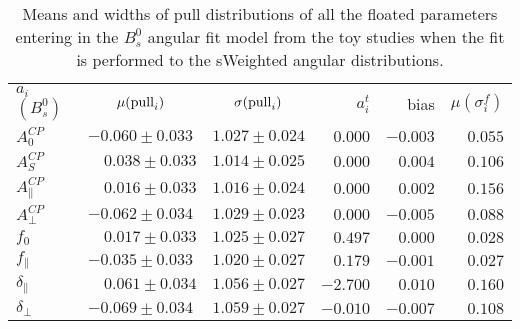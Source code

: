 \begin{table}[htbp]
\begin{center}
\caption[Means and widths of pull distributions of all the floated parameters entering the angular fit model from the toy studies when the fit is performed to the sWeighted angular distributions]{\label{tab:AngularPullResults_sWeights} Means and widths of pull distributions of all the floated parameters entering in the $B^0_s$ angular fit model from the toy studies when the fit is performed to the sWeighted angular distributions. }%
\vspace{5pt}
\begin{tabular}{l|c|c||r|r|r}
 \multirow{2}{*}{$a_i$ $(B^0_s)$} & \multirow{2}{*}{$\mu({\rm pull}_i)$} & \multirow{2}{*}{$\sigma({\rm pull}_i)$} & \multirow{2}{*}{ $a_i^t $ } & \multirow{2}{*}{bias} & \multirow{2}{*}{$\mu(\sigma_i^f) $} \\
					       &	 					  &		&   &   &	\\	
\hline

$A^{C\!P}_0$ 	&$	-0.060	 \pm	0.033	$&$	1.027	 \pm	0.024	$&$	0.000	$&$	-0.003	$&$	0.055	 $\\
$A^{C\!P}_S$ 	&$	\phantom{-}0.038	 \pm	0.033	$&$	1.014	 \pm	0.025	$&$	0.000	$&$	0.004	$&$	0.106	 $\\
$A^{C\!P}_{\|}$ 	&$	\phantom{-}0.016	 \pm	0.033	$&$	1.016	 \pm	0.024	$&$	0.000	$&$	0.002	$&$	0.156	 $\\
$A^{C\!P}_{\perp}$ 	&$	-0.062	 \pm	0.034	$&$	1.029	 \pm	0.023	$&$	0.000	$&$	-0.005	$&$	0.088	 $\\
															
\hline															
															
$f_0$	&$	\phantom{-}0.017	 \pm	0.033	$&$	1.025	 \pm	0.027	$&$	0.497	$&$	0.000	$&$	0.028	 $\\
$f_{\|}$	&$	-0.035	 \pm	0.033	$&$	1.020	 \pm	0.027	$&$	0.179	$&$	-0.001	$&$	0.027	 $\\
$\delta_{\|}$	&$	\phantom{-}0.061	 \pm	0.034	$&$	1.056	 \pm	0.027	$&$	-2.700	$&$	0.010	$&$	0.160	 $\\
$\delta_{\perp}$	&$	-0.069	 \pm	0.034	$&$	1.059	 \pm	0.027	$&$	-0.010	$&$	-0.007	$&$	0.108	 $\\
															
\hline															
															

\end{tabular}
\end{center}
\end{table}
